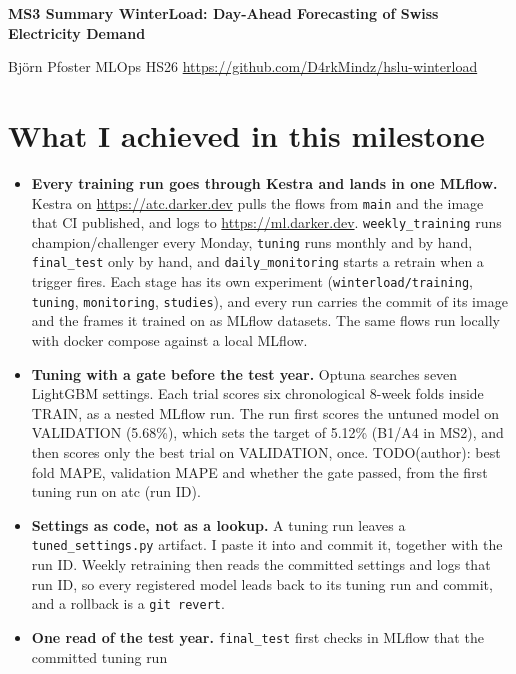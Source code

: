 \documentclass[10pt,a4paper]{article}
\begin{document}
\small

{\raggedright\Large\bfseries MS3 Summary \textperiodcentered{} WinterLoad: Day-Ahead Forecasting of Swiss Electricity Demand\par}
\vspace{2pt}
Björn Pfoster \textperiodcentered{} MLOps HS26 \textperiodcentered{} \url{https://github.com/D4rkMindz/hslu-winterload}

\section{What I achieved in this milestone}
\begin{itemize}
  \item \textbf{Every training run goes through Kestra and lands in one MLflow.} Kestra on
        \url{https://atc.darker.dev} pulls the flows from \texttt{main} and the image that CI published, and logs to
        \url{https://ml.darker.dev}. \texttt{weekly\_training} runs champion/challenger every Monday,
        \texttt{tuning} runs monthly and by hand, \texttt{final\_test} only by hand, and \texttt{daily\_monitoring}
        starts a retrain when a trigger fires. Each stage has its own experiment (\texttt{winterload/training},
        \texttt{tuning}, \texttt{monitoring}, \texttt{studies}), and every run carries the commit of its image and the
        frames it trained on as MLflow datasets. The same flows run locally with docker compose against a local MLflow.
  \item \textbf{Tuning with a gate before the test year.} Optuna searches seven LightGBM settings. Each trial scores
        six chronological 8-week folds inside TRAIN, as a nested MLflow run. The run first scores the untuned model on
        VALIDATION (5.68\%), which sets the target of 5.12\% (B1/A4 in MS2), and then scores only the best trial on
        VALIDATION, once. TODO(author): best fold MAPE, validation MAPE and whether the gate passed, from the first
        tuning run on atc (run ID).
  \item \textbf{Settings as code, not as a lookup.} A tuning run leaves a \texttt{tuned\_settings.py} artifact. I
        paste it into  and commit it, together with the run ID. Weekly
        retraining then reads the committed settings and logs that run ID, so every registered model leads back to its
        tuning run and commit, and a rollback is a \texttt{git revert}.
  \item \textbf{One read of the test year.} \texttt{final\_test} first checks in MLflow that the committed tuning run

\end{itemize}
\end{document}

